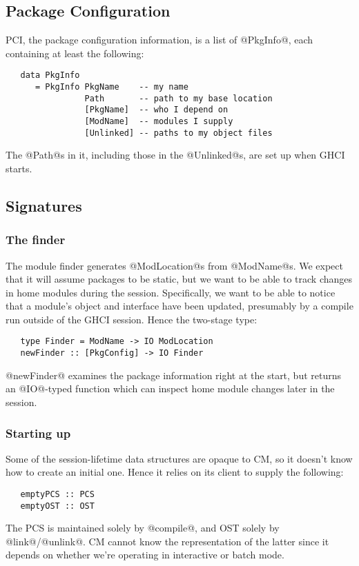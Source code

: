 \documentclass[11pt]{article}
\begin{document}
\subsection{Package Configuration}
\label{sec:package-config}

PCI, the package configuration information, is a list of @PkgInfo@,
each containing at least the following:
\begin{verbatim}
   data PkgInfo
      = PkgInfo PkgName    -- my name
                Path       -- path to my base location
                [PkgName]  -- who I depend on
                [ModName]  -- modules I supply
                [Unlinked] -- paths to my object files
\end{verbatim}
The @Path@s in it, including those in the @Unlinked@s, are set up
when GHCI starts.  

\subsection{Signatures}

\subsubsection*{The finder}
The module finder generates @ModLocation@s from @ModName@s.  We
expect that it will assume packages to be static, but we want to 
be able to track changes in home modules during the session.
Specifically, we want to be able to notice that a module's object and
interface have been updated, presumably by a compile run outside of 
the GHCI session.  Hence the two-stage type:
\begin{verbatim}
   type Finder = ModName -> IO ModLocation
   newFinder :: [PkgConfig] -> IO Finder
\end{verbatim}
@newFinder@ examines the package information right at the start, but 
returns an @IO@-typed function which can inspect home module changes
later in the session.


\subsubsection*{Starting up}
Some of the session-lifetime data structures are opaque to CM, so
it doesn't know how to create an initial one.  Hence it relies on its
client to supply the following:
\begin{verbatim}
   emptyPCS :: PCS
   emptyOST :: OST
\end{verbatim}
The PCS is maintained solely by @compile@, and OST solely by
@link@/@unlink@.  CM cannot know the representation of the latter
since it depends on whether we're operating in interactive or batch
mode.
\end{document}
